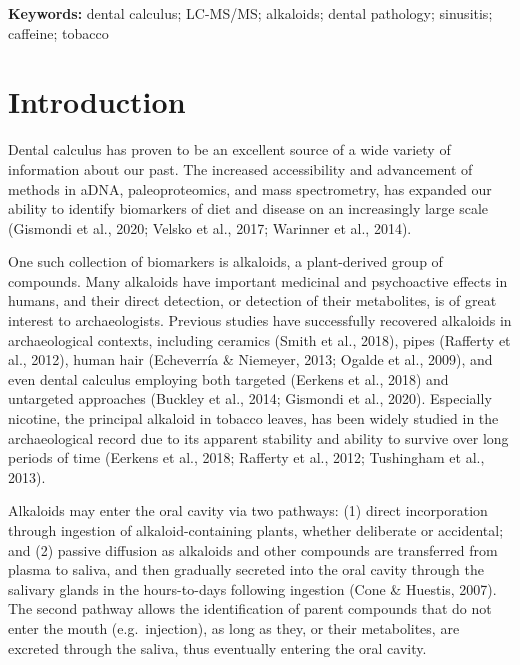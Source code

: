\documentclass[
]{article}
\begin{document}
\small \textbf{Keywords:}  dental calculus; LC-MS/MS; alkaloids; dental
pathology; sinusitis; caffeine; tobacco   \\

\vfill

\ifdefined\Shaded\renewenvironment{Shaded}{\begin{tcolorbox}[breakable, interior hidden, borderline west={3pt}{0pt}{shadecolor}, enhanced, boxrule=0pt, sharp corners, frame hidden]}{\end{tcolorbox}}\fi

\hypertarget{introduction}{%
\section{Introduction}\label{introduction}}

Dental calculus has proven to be an excellent source of a wide variety
of information about our past. The increased accessibility and
advancement of methods in aDNA, paleoproteomics, and mass spectrometry,
has expanded our ability to identify biomarkers of diet and disease on
an increasingly large scale (Gismondi et al., 2020; Velsko et al., 2017;
Warinner et al., 2014).

One such collection of biomarkers is alkaloids, a plant-derived group of
compounds. Many alkaloids have important medicinal and psychoactive
effects in humans, and their direct detection, or detection of their
metabolites, is of great interest to archaeologists. Previous studies
have successfully recovered alkaloids in archaeological contexts,
including ceramics (Smith et al., 2018), pipes (Rafferty et al., 2012),
human hair (Echeverría \& Niemeyer, 2013; Ogalde et al., 2009), and even
dental calculus employing both targeted (Eerkens et al., 2018) and
untargeted approaches (Buckley et al., 2014; Gismondi et al., 2020).
Especially nicotine, the principal alkaloid in tobacco leaves, has been
widely studied in the archaeological record due to its apparent
stability and ability to survive over long periods of time (Eerkens et
al., 2018; Rafferty et al., 2012; Tushingham et al., 2013).

Alkaloids may enter the oral cavity via two pathways: (1) direct
incorporation through ingestion of alkaloid-containing plants, whether
deliberate or accidental; and (2) passive diffusion as alkaloids and
other compounds are transferred from plasma to saliva, and then
gradually secreted into the oral cavity through the salivary glands in
the hours-to-days following ingestion (Cone \& Huestis, 2007). The
second pathway allows the identification of parent compounds that do not
enter the mouth (e.g.~injection), as long as they, or their metabolites,
are excreted through the saliva, thus eventually entering the oral
cavity.
\end{document}
